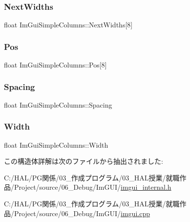 \subsubsection{\texorpdfstring{Next\+Widths}{NextWidths}}
{\footnotesize\ttfamily float Im\+Gui\+Simple\+Columns\+::\+Next\+Widths\mbox{[}8\mbox{]}}

\mbox{\label{struct_im_gui_simple_columns_a3c13060fe3e4732512a663bb369f51d8}} 
\subsubsection{\texorpdfstring{Pos}{Pos}}
{\footnotesize\ttfamily float Im\+Gui\+Simple\+Columns\+::\+Pos\mbox{[}8\mbox{]}}

\mbox{\label{struct_im_gui_simple_columns_aee2a43067de182ca1aa1447c8b658935}} 
\subsubsection{\texorpdfstring{Spacing}{Spacing}}
{\footnotesize\ttfamily float Im\+Gui\+Simple\+Columns\+::\+Spacing}

\mbox{\label{struct_im_gui_simple_columns_a3b7ed6f3aa04e3ead1ea17e4d9f92767}} 
\subsubsection{\texorpdfstring{Width}{Width}}
{\footnotesize\ttfamily float Im\+Gui\+Simple\+Columns\+::\+Width}



この構造体詳解は次のファイルから抽出されました\+:\begin{DoxyCompactItemize}
\item 
C\+:/\+H\+A\+L/\+P\+G関係/03\+\_\+作成プログラム/03\+\_\+\+H\+A\+L授業/就職作品/\+Project/source/06\+\_\+\+Debug/\+Im\+G\+U\+I/\mbox{\hyperlink{imgui__internal_8h}{imgui\+\_\+internal.\+h}}\item 
C\+:/\+H\+A\+L/\+P\+G関係/03\+\_\+作成プログラム/03\+\_\+\+H\+A\+L授業/就職作品/\+Project/source/06\+\_\+\+Debug/\+Im\+G\+U\+I/\mbox{\hyperlink{imgui_8cpp}{imgui.\+cpp}}\end{DoxyCompactItemize}
